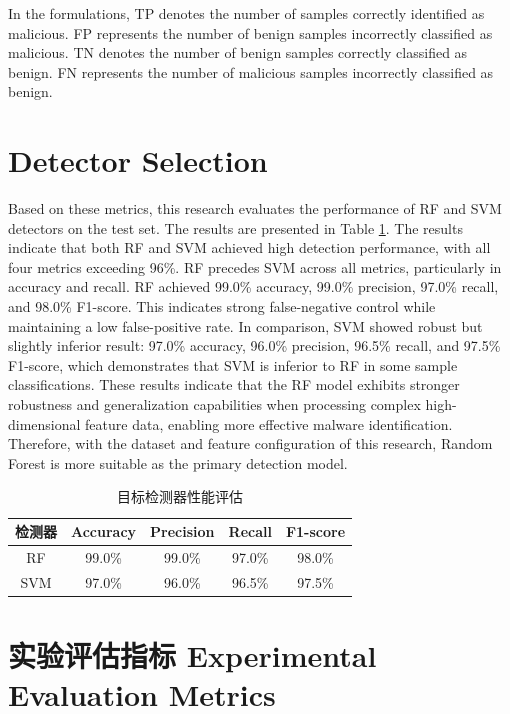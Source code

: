 In the formulations, TP denotes the number of samples correctly identified as malicious. FP represents the number of benign samples incorrectly classified as malicious. TN denotes the number of benign samples correctly classified as benign. FN represents the number of malicious samples incorrectly classified as benign.

\section{Detector Selection}

Based on these metrics, this research evaluates the performance of RF and SVM detectors on the test set. The results are presented in Table \ref{tab:5.4}. The results indicate that both RF and SVM achieved high detection performance, with all four metrics exceeding 96\%. RF precedes SVM across all metrics, particularly in accuracy and recall. RF achieved 99.0\% accuracy, 99.0\% precision, 97.0\% recall, and 98.0\% F1-score. This indicates strong false-negative control while maintaining a low false-positive rate. In comparison, SVM showed robust but slightly inferior result: 97.0\% accuracy, 96.0\% precision, 96.5\% recall, and 97.5\% F1-score, which demonstrates that SVM is inferior to RF in some sample classifications. These results indicate that the RF model exhibits stronger robustness and generalization capabilities when processing complex high-dimensional feature data, enabling more effective malware identification. Therefore, with the dataset and feature configuration of this research, Random Forest is more suitable as the primary detection model.

\begin{table}[htbp]
	\centering
	\caption{目标检测器性能评估}
	\label{tab:5.4}
	\renewcommand{\arraystretch}{1.3}
	\begin{tabular*}{0.9\textwidth}{@{\extracolsep{\fill}}ccccc}
		\toprule
		检测器 & Accuracy & Precision & Recall & F1-score \\
		\midrule
		RF  & 99.0\% & 99.0\% & 97.0\% & 98.0\% \\
		SVM & 97.0\% & 96.0\% & 96.5\% & 97.5\% \\
		\bottomrule
	\end{tabular*}
\end{table}

\section{实验评估指标 Experimental Evaluation Metrics}

